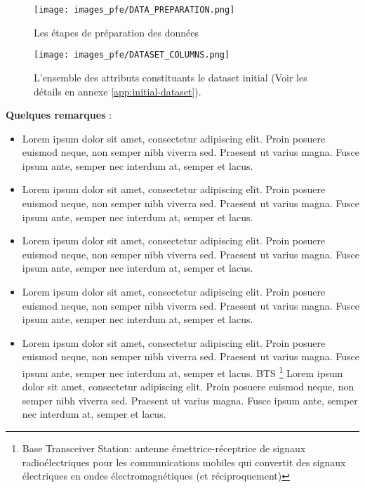 \begin{figure}[hbt!]
  \centering
  \texttt{[image: images\_pfe/DATA\_PREPARATION.png]}
  \caption{Les étapes de préparation des données}
  \label{fig:data-preparation}
\end{figure}
\FloatBarrier

\begin{figure}[hbt!]
  \centering
  \texttt{[image: images\_pfe/DATASET\_COLUMNS.png]}
  \caption{L'ensemble des attributs constituants le dataset initial (Voir les détails en annexe \ref{app:initial-dataset}).}
  \label{fig:dataset-columns}
\end{figure}
\FloatBarrier




\textbf{Quelques remarques} :
\renewcommand{\labelitemi}{$\bullet$}
\begin{itemize}
    \item Lorem ipsum dolor sit amet, consectetur adipiscing elit. Proin posuere euismod neque, non semper nibh viverra sed. Praesent ut varius magna. Fusce ipsum ante, semper nec interdum at, semper et lacus.
    \item Lorem ipsum dolor sit amet, consectetur adipiscing elit. Proin posuere euismod neque, non semper nibh viverra sed. Praesent ut varius magna. Fusce ipsum ante, semper nec interdum at, semper et lacus.
    \item Lorem ipsum dolor sit amet, consectetur adipiscing elit. Proin posuere euismod neque, non semper nibh viverra sed. Praesent ut varius magna. Fusce ipsum ante, semper nec interdum at, semper et lacus.
    \item Lorem ipsum dolor sit amet, consectetur adipiscing elit. Proin posuere euismod neque, non semper nibh viverra sed. Praesent ut varius magna. Fusce ipsum ante, semper nec interdum at, semper et lacus.
    \item Lorem ipsum dolor sit amet, consectetur adipiscing elit. Proin posuere euismod neque, non semper nibh viverra sed. Praesent ut varius magna. Fusce ipsum ante, semper nec interdum at, semper et lacus. BTS \footnote{Base Transceiver Station: antenne émettrice-réceptrice de signaux radioélectriques pour les communications mobiles qui convertit des signaux électriques en ondes électromagnétiques (et réciproquement)} Lorem ipsum dolor sit amet, consectetur adipiscing elit. Proin posuere euismod neque, non semper nibh viverra sed. Praesent ut varius magna. Fusce ipsum ante, semper nec interdum at, semper et lacus.
    
\end{itemize}



